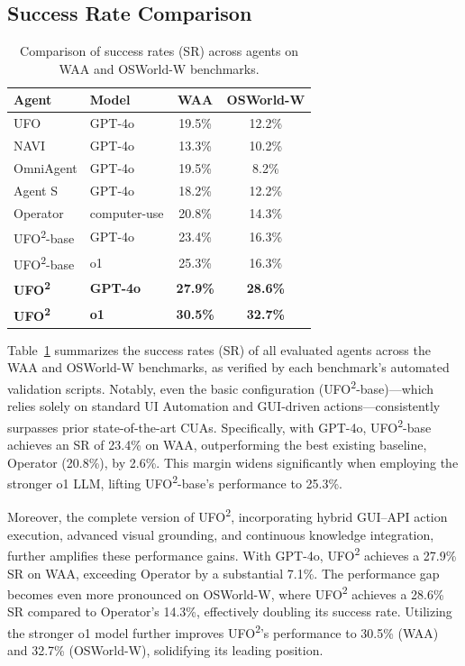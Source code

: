 \documentclass[sigplan,10pt]{acmart}
\newcommand{\name}{\textsc{UFO}\textsuperscript{2}\xspace}
\begin{document}
\subsection{Success Rate Comparison}

\begin{table}[t]
\centering
\caption{Comparison of success rates (SR) across agents on WAA and OSWorld-W benchmarks.}
\label{tab:compare}
\begin{tabular}{l|l|c|c}
\hline
\textbf{Agent} & \textbf{Model} & \textbf{WAA} & \textbf{OSWorld-W} \\ \hline
UFO            & GPT-4o         & 19.5\%       & 12.2\%                   \\ \hline
NAVI           & GPT-4o         & 13.3\%       & 10.2\%                   \\ \hline
OmniAgent      & GPT-4o         & 19.5\%       & 8.2\%                   \\ \hline
Agent S        & GPT-4o         & 18.2\%       & 12.2\%                   \\ \hline
Operator       & computer-use   & 20.8\%       & 14.3\%             \\ \hline\hline
\name-base     & GPT-4o         & 23.4\%        & 16.3\%                    \\ \hline
\name-base     & o1             & 25.3\%        & 16.3\%                    \\ \hline
\textbf{\name} & \textbf{GPT-4o}& \textbf{27.9\%}&  \textbf{28.6\%}         \\ \hline
\textbf{\name} & \textbf{o1}    & \textbf{30.5\%}&   \textbf{32.7\%}        \\ \hline\hline
\end{tabular}
\end{table}

Table~\ref{tab:compare} summarizes the success rates (SR) of all evaluated agents across the WAA and OSWorld-W benchmarks, as verified by each benchmark's automated validation scripts. Notably, even the basic configuration (\name-base)—which relies solely on standard UI Automation and GUI-driven actions—consistently surpasses prior state-of-the-art CUAs. Specifically, with GPT-4o, \name-base achieves an SR of 23.4\% on WAA, outperforming the best existing baseline, Operator (20.8\%), by 2.6\%. This margin widens significantly when employing the stronger o1 LLM, lifting \name-base's performance to 25.3\%.

Moreover, the complete version of \name, incorporating hybrid GUI–API action execution, advanced visual grounding, and continuous knowledge integration, further amplifies these performance gains. With GPT-4o, \name achieves a 27.9\% SR on WAA, exceeding Operator by a substantial 7.1\%. The performance gap becomes even more pronounced on OSWorld-W, where \name achieves a 28.6\% SR compared to Operator's 14.3\%, effectively doubling its success rate. Utilizing the stronger o1 model further improves \name's performance to 30.5\% (WAA) and 32.7\% (OSWorld-W), solidifying its leading position.
\end{document}
